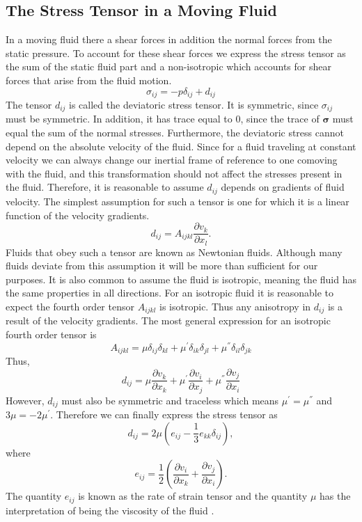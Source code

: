 \documentclass[12pt, letter]{report}
\begin{document}
\subsection{The Stress Tensor in a Moving Fluid}
In a moving fluid there a shear forces in addition the normal forces from the static pressure. To account for these shear forces we express the stress tensor as the sum of the static fluid part and a non-isotropic which accounts for shear forces that arise from the fluid motion.
\begin{equation} 
\label{eq:stress}
\sigma_{ij} = -p \delta_{ij} + d_{ij}
\end{equation}
The tensor $d_{ij}$ is called the deviatoric stress tensor. It is symmetric, since $\sigma_{ij}$ must be symmetric. In addition, it has trace equal to $0$, since the trace of $\boldsymbol{\sigma}$ must equal the sum of the normal stresses. Furthermore, the deviatoric stress cannot depend on the absolute velocity of the fluid. Since for a fluid traveling at constant velocity we can always change our inertial frame of reference to one comoving with the fluid, and this transformation should not affect the stresses present in the fluid. Therefore, it is reasonable to assume $d_{ij}$ depends on gradients of fluid velocity. The simplest assumption for such a tensor is one for which it is a linear function of the velocity gradients. 
\begin{equation} 
d_{ij} = A_{ijkl} \frac{\partial v_k}{\partial x_l}.
\end{equation}
Fluids that obey such a tensor are known as Newtonian fluids. Although many fluids deviate from this assumption it will be more than sufficient for our purposes. It is also common to assume the fluid is isotropic, meaning the fluid has the same properties in all directions. For an isotropic fluid it is reasonable to expect the fourth order tensor $A_{ijkl}$ is isotropic. Thus any anisotropy in $d_{ij}$ is a result of the velocity gradients. The most general expression for an isotropic fourth order tensor is 
\begin{equation}
A_{ijkl} = \mu \delta_{ij}\delta_{kl} + \mu^{'} \delta_{ik}\delta_{jl} + \mu^{''} \delta_{il}\delta_{jk}
\end{equation}
Thus,
\begin{equation}
d_{ij} = \mu \frac{\partial v_k}{\partial x_k} + \mu^{'} \frac{\partial v_i}{\partial x_j}+\mu^{''} \frac{\partial v_j}{\partial x_i} 
\end{equation}
However, $d_{ij}$ must also be symmetric and traceless which means $\mu^{'}=\mu^{''}$ and $3\mu = -2\mu^{'}$. Therefore we can finally express the stress tensor as
\begin{equation}
\label{eq:deviatoric}
d_{ij} = 2 \mu \left( e_{ij}- \frac{1}{3} e_{kk}\delta_{ij} \right),
\end{equation}
where
\begin{equation}
\label{eq:rate_of_strain}
e_{ij}=\frac{1}{2}\left( \frac{\partial v_i}{\partial x_k} + \frac{\partial v_j}{\partial x_i} \right).
\end{equation}
The quantity $e_{ij}$ is known as the rate of strain tensor and the quantity $\mu$ has the interpretation of being the viscosity of the fluid \cite{Batchelor2000}.
\end{document}
